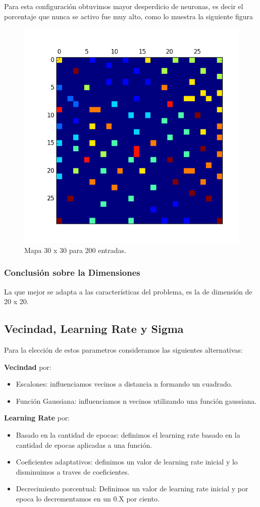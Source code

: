 Para esta configuración obtuvimos mayor desperdicio de neuronas,
es decir el porcentaje que nunca se activo fue muy alto, como lo muestra
la siguiente figura

\begin{figure}[H]
  \centering
  \includegraphics[width=0.5\columnwidth]{secciones/graficos/kohonen/mapa3030.png}
  \caption{Mapa 30 x 30 para 200 entradas.}
  \label{fig:mapa 30 30 200}
\end{figure}


\subsubsection{Conclusión sobre la Dimensiones}


La que mejor se adapta a las características del problema, es la
de dimensión de 20 x 20.


\subsection{Vecindad, Learning Rate y Sigma}

Para la elección de estos parametros consideramos las siguientes
alternativas:

\textbf{Vecindad} por:

\begin{itemize}
	\item Escalones: influenciamos vecinos a distancia n formando
un cuadrado.
	\item Función Gaussiana: influenciamos n vecinos utilizando
una función gaussiana.
\end{itemize}


\textbf{Learning Rate} por:

\begin{itemize}
	\item Basado en la cantidad de epocas: definimos el learning
rate basado en la cantidad de epocas aplicadas a una función.
	\item Coeficientes adaptativos: definimos un valor de
learning rate inicial y lo disminuimos a traves de coeficientes.
	\item Decrecimiento porcentual: Definimos un valor de 
learning rate inicial y por epoca lo decrementamos en un 0.X por ciento.
\end{itemize}

